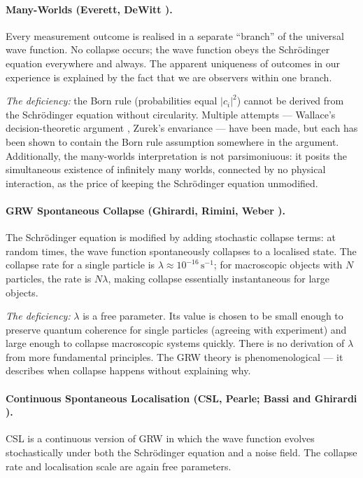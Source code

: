 \documentclass[12pt,a4paper]{article}
\begin{document}
\paragraph{Many-Worlds (Everett, DeWitt \cite{DeWitt1973}).}
Every measurement outcome is realised in a separate ``branch'' of the universal wave function.  No collapse occurs; the wave function obeys the Schr\"odinger equation everywhere and always.  The apparent uniqueness of outcomes in our experience is explained by the fact that we are observers within one branch.

\textit{The deficiency:} the Born rule (probabilities equal $|c_i|^2$) cannot be derived from the Schr\"odinger equation without circularity.  Multiple attempts --- Wallace's decision-theoretic argument \cite{Wallace2003}, Zurek's envariance \cite{Zurek2003} --- have been made, but each has been shown to contain the Born rule assumption somewhere in the argument.  Additionally, the many-worlds interpretation is not parsimoniuous: it posits the simultaneous existence of infinitely many worlds, connected by no physical interaction, as the price of keeping the Schr\"odinger equation unmodified.

\paragraph{GRW Spontaneous Collapse (Ghirardi, Rimini, Weber \cite{GRW1986}).}
The Schr\"odinger equation is modified by adding stochastic collapse terms: at random times, the wave function spontaneously collapses to a localised state.  The collapse rate for a single particle is $\lambda\approx10^{-16}\,\mathrm{s}^{-1}$; for macroscopic objects with $N$ particles, the rate is $N\lambda$, making collapse essentially instantaneous for large objects.

\textit{The deficiency:} $\lambda$ is a free parameter.  Its value is chosen to be small enough to preserve quantum coherence for single particles (agreeing with experiment) and large enough to collapse macroscopic systems quickly.  There is no derivation of $\lambda$ from more fundamental principles.  The GRW theory is phenomenological --- it describes when collapse happens without explaining why.

\paragraph{Continuous Spontaneous Localisation (CSL, Pearle; Bassi and Ghirardi \cite{Bassi2003}).}
CSL is a continuous version of GRW in which the wave function evolves stochastically under both the Schr\"odinger equation and a noise field.  The collapse rate and localisation scale are again free parameters.
\end{document}
